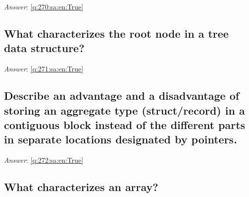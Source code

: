 \documentclass[a4paper,11pt,oneside]{article}
\begin{document}
\begin{sloppypar}
\label{q:270:sa:en:False}

\vspace{2cm}

\noindent\makebox[\textwidth]{\hrulefill}

\vspace{1cm}

\textit{Answer}: \autoref{q:270:sa:en:True}



\subsection{What characterizes the root node in a tree data structure?}

\label{q:271:sa:en:False}

\vspace{2cm}

\noindent\makebox[\textwidth]{\hrulefill}

\vspace{1cm}

\textit{Answer}: \autoref{q:271:sa:en:True}



\subsection{Describe an advantage and a disadvantage of storing an aggregate type (struct/record) in a contiguous block instead of the different parts in separate locations designated by pointers.}

\label{q:272:sa:en:False}

\vspace{2cm}

\noindent\makebox[\textwidth]{\hrulefill}

\vspace{1cm}

\textit{Answer}: \autoref{q:272:sa:en:True}



\subsection{What characterizes an array?}

\label{q:273:sa:en:False}

\vspace{2cm}

\noindent\makebox[\textwidth]{\hrulefill}

\vspace{1cm}


\end{sloppypar}
\end{document}
